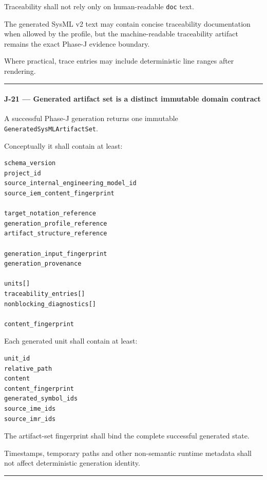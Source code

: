 Traceability shall not rely only on human-readable \texttt{doc} text.

The generated SysML v2 text may contain concise traceability documentation when allowed by the profile, but the machine-readable traceability artifact remains the exact Phase-J evidence boundary.

Where practical, trace entries may include deterministic line ranges after rendering.

\begin{center}\rule{0.5\linewidth}{0.5pt}\end{center}

\hypertarget{j-21--generated-artifact-set-is-a-distinct-immutable-domain-contract}{%
\paragraph{J-21 --- Generated artifact set is a distinct immutable domain contract}\label{j-21--generated-artifact-set-is-a-distinct-immutable-domain-contract}}

A successful Phase-J generation returns one immutable \texttt{GeneratedSysMLArtifactSet}.

Conceptually it shall contain at least:

\begin{verbatim}
schema_version
project_id
source_internal_engineering_model_id
source_iem_content_fingerprint

target_notation_reference
generation_profile_reference
artifact_structure_reference

generation_input_fingerprint
generation_provenance

units[]
traceability_entries[]
nonblocking_diagnostics[]

content_fingerprint
\end{verbatim}

Each generated unit shall contain at least:

\begin{verbatim}
unit_id
relative_path
content
content_fingerprint
generated_symbol_ids
source_ime_ids
source_imr_ids
\end{verbatim}

The artifact-set fingerprint shall bind the complete successful generated state.

Timestamps, temporary paths and other non-semantic runtime metadata shall not affect deterministic generation identity.

\begin{center}\rule{0.5\linewidth}{0.5pt}\end{center}

